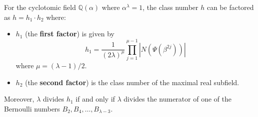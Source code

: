 For the cyclotomic field $\mathbb{Q}(\alpha)$ where $\alpha^\lambda = 1$, the class number $h$ can be factored as $h = h_1 \cdot h_2$ where:
\begin{itemize}
\item $h_1$ (the \textbf{first factor}) is given by
$$h_1 = \frac{1}{(2\lambda)^{\mu}} \prod_{j=1}^{\mu-1} |N(\Psi(\beta^{2j}))|$$
where $\mu = (\lambda-1)/2$.
\item $h_2$ (the \textbf{second factor}) is the class number of the maximal real subfield.
\end{itemize}
Moreover, $\lambda$ divides $h_1$ if and only if $\lambda$ divides the numerator of one of the Bernoulli numbers $B_2, B_4, \ldots, B_{\lambda-3}$.
